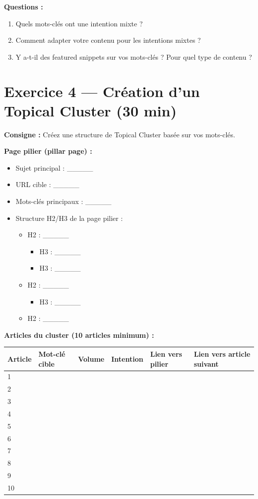 \documentclass[12pt,a4paper]{report}
\begin{document}
\textbf{Questions :}
\begin{enumerate}
\item Quels mots-clés ont une intention mixte ?
\item Comment adapter votre contenu pour les intentions mixtes ?
\item Y a-t-il des featured snippets sur vos mots-clés ? Pour quel type de contenu ?
\end{enumerate}

\section{Exercice 4 --- Création d'un Topical Cluster (30 min)}

\textbf{Consigne :} Créez une structure de Topical Cluster basée sur vos mots-clés.

\textbf{Page pilier (pillar page) :}
\begin{itemize}
\item Sujet principal : \_\_\_\_\_
\item URL cible : \_\_\_\_\_
\item Mots-clés principaux : \_\_\_\_\_
\item Structure H2/H3 de la page pilier :
   \begin{itemize}
   \item H2 : \_\_\_\_\_
      \begin{itemize}
      \item H3 : \_\_\_\_\_
      \item H3 : \_\_\_\_\_
      \end{itemize}
   \item H2 : \_\_\_\_\_
      \begin{itemize}
      \item H3 : \_\_\_\_\_
      \end{itemize}
   \item H2 : \_\_\_\_\_
   \end{itemize}
\end{itemize}

\textbf{Articles du cluster (10 articles minimum) :}

\begin{longtable}{|l|l|c|c|l|l|}
\hline
\textbf{Article} & \textbf{Mot-clé cible} & \textbf{Volume} & \textbf{Intention} & \textbf{Lien vers pilier} & \textbf{Lien vers article suivant} \\
\hline
1 & & & & & \\
\hline
2 & & & & & \\
\hline
3 & & & & & \\
\hline
4 & & & & & \\
\hline
5 & & & & & \\
\hline
6 & & & & & \\
\hline
7 & & & & & \\
\hline
8 & & & & & \\
\hline
9 & & & & & \\
\hline
10 & & & & & \\
\hline
\end{longtable}
\end{document}
